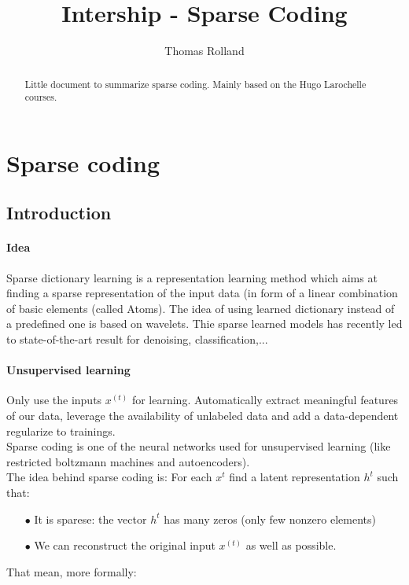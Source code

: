 \documentclass[a4paper,10pt]{article}
\title{Intership - Sparse Coding}
\author{Thomas Rolland}
\date{}%
\begin{document}
\maketitle

\begin{abstract}
Little document to summarize sparse coding. Mainly based on the Hugo Larochelle courses.
\end{abstract}
\section{Sparse coding}
\subsection{Introduction}
\paragraph{Idea} Sparse dictionary learning is a representation learning method which aims at finding a sparse representation of the input data (in form of a linear combination of basic elements (called Atoms). The idea of using learned dictionary instead of a predefined one is based on wavelets. Thie sparse learned models has recently led to state-of-the-art result for denoising, classification,...
\paragraph{Unsupervised learning} Only use the inputs $x^{(t)}$ for learning. Automatically extract meaningful features of our data, leverage the availability of unlabeled data and add a data-dependent regularize to trainings.\\

Sparse coding is one of the neural networks used for unsupervised learning  (like restricted boltzmann machines and autoencoders).\\
The idea behind sparse coding is: For each $x^{t}$ find a latent representation $h^{t}$ such that:
\begin{itemize}
 \item[$\bullet$] It is sparese: the vector $h^{t}$ has many zeros (only few nonzero elements)
 \item[$\bullet$] We can reconstruct the original input $x^{(t)}$ as well as possible.
\end{itemize}
That mean, more formally:\\
\end{document}
